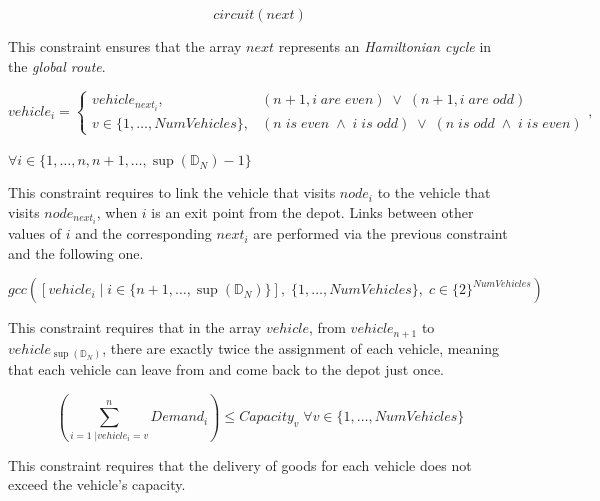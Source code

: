 \documentclass[../main.tex]{subfiles}
\begin{document}
\begin{center}
    \begin{equation}
        circuit(next)
    \end{equation}
\end{center}
This constraint ensures that the array $next$ represents an \textit{Hamiltonian cycle} in the \textit{global route}.

\begin{center}
    \begin{equation}
        vehicle_i =
        \begin{cases}
            vehicle_{next_i}, & (\text{$n+1, i$} \; are \; even) \; \vee \; (\text{$n+1, i$} \; are \; odd)\\
            \text{$v \in \{1,\dots,NumVehicles\}$}, & (\text{$n$} \; is \; even \; \wedge \; \text{$i$} \; is \; odd ) \; \vee \; (\text{$n$} \; is \; odd \; \wedge \; \text{$i$} \; is \; even )
        \end{cases},
    \end{equation}\\
    \begin{math}
        \forall i \in \{1,\dots,n,n+1,\dots,\sup{}(\mathbb{D}_N) - 1\}
    \end{math}
\end{center}
This constraint requires to link the vehicle that visits $node_i$ to the vehicle that visits $node_{next_i}$, when $i$ is an exit point from the depot.
Links between other values of $i$ and the corresponding $next_i$ are performed via the previous constraint and the following one.

\begin{center}
    \begin{equation}
        gcc([vehicle_i \; | \; i \in \{n+1,\dots,\sup{}(\mathbb{D}_N)\}], \; \{1,\dots,NumVehicles\}, \; c \in \{2\}^{NumVehicles})
    \end{equation}
\end{center}
This constraint requires that in the array $vehicle$, from $vehicle_{n+1}$ to $vehicle_{\sup{}(\mathbb{D}_N)}$, there are exactly twice the assignment of each vehicle, meaning that each vehicle can leave from and come back to the depot just once.

\begin{center}
    \begin{equation}
        (\sum_{i = 1 \; | vehicle_i = v}^n{Demand_i}) \leq Capacity_v \; \forall v \in \{1,\dots,NumVehicles\}
    \end{equation}
\end{center}
This constraint requires that the delivery of goods for each vehicle does not exceed the vehicle's capacity.
\end{document}
